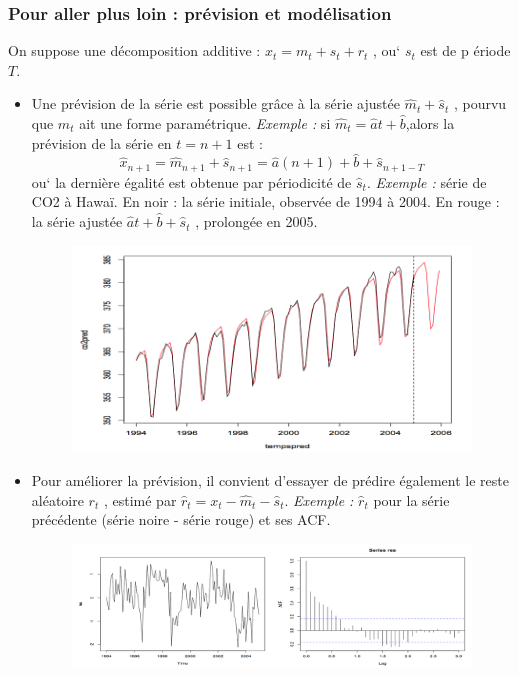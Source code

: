 \subsubsection{Pour aller plus loin : prévision et modélisation}

On suppose une décomposition additive : $x_{t} = m_{t} + s_{t} + r_{t}$  , ou` $s_{t}$ est de p ériode $T$.

\begin{itemize}
\item Une prévision de la série est possible grâce à la série ajustée $\hat{m}_{t} + \hat{s}_{t}$ , pourvu que $\hat{m}_{t}$ ait une forme paramétrique.\newline
\textit{Exemple : }  si $\hat{m}_{t} =\hat{a}t+\hat{b}$,alors la prévision de la série en $t=n+1$ est :
$$\hat{x}_{n+1} = \hat{m}_{n+1} + \hat{s}_{n+1} = \hat{a}(n+1) + \hat{b} + \hat{s}_{n+1-T}$$
ou` la dernière égalité est obtenue par périodicité de $\hat{s}_{t}$.\newline
\textit{Exemple : } série de CO2 à Hawaï. En noir : la série initiale, observée de 1994 à 2004. En rouge : la série ajustée $\hat{a}t + \hat{b} + \hat{s}_{t}$ , prolongée en 2005.
\begin{figure}[H]\begin{center}\includegraphics[scale=0.7]{ilu/ccm43.png}\end{center}\end{figure}
\item Pour améliorer la prévision, il convient d'essayer de prédire également le reste aléatoire $r_{t}$ , estimé par $\hat{r}_{t} = x_{t} - \hat{m}_{t} - \hat{s}_{t}$.\newline
\textit{Exemple : } $\hat{r}_{t}$ pour la série précédente (série noire - série rouge) et ses ACF.
\begin{figure}[H]\begin{center}\includegraphics[scale=0.7]{ilu/ccm44.png}\end{center}\end{figure}

\end{itemize}
